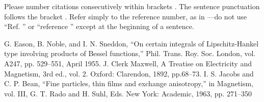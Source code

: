 \documentclass{article}
\begin{document}
Please number citations consecutively within brackets \cite{Eason}. The sentence punctuation follows the bracket \cite{Maxwell}. Refer simply to the reference number, as in \cite{Jacobs}---do not use ``Ref. \cite{Jacobs}'' or ``reference \cite{Jacobs}'' except at the beginning of a sentence. 

\begin{thebibliography}{00}
 G. Eason, B. Noble, and I. N. Sneddon, ``On certain integrals of Lipschitz-Hankel type involving products of Bessel functions,'' Phil. Trans. Roy. Soc. London, vol. A247, pp. 529--551, April 1955.
 J. Clerk Maxwell, A Treatise on Electricity and Magnetism, 3rd ed., vol. 2. Oxford: Clarendon, 1892, pp.68--73.
 I. S. Jacobs and C. P. Bean, ``Fine particles, thin films and exchange anisotropy,'' in Magnetism, vol. III, G. T. Rado and H. Suhl, Eds. New York: Academic, 1963, pp. 271--350
\end{thebibliography}
\end{document}
